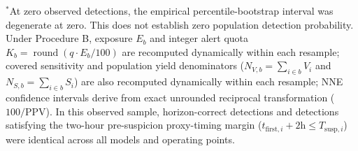 \documentclass[12pt,a4paper]{article}
\begin{document}
\begin{landscape}
\begin{table}[p]
\begin{singlespace}
\begin{tabular*}{\linewidth}{@{\extracolsep{\fill}}llccccccc}
\bottomrule
\end{tabular*}
\vspace{0.4em}
\raggedright
\fontsize{7.5pt}{9.5pt}\selectfont
$^*$At zero observed detections, the empirical percentile-bootstrap interval was degenerate at zero. This does not establish zero population detection probability. Under Procedure B, exposure $E_b$ and integer alert quota $K_b = \operatorname{round}(q \cdot E_b / 100)$ are recomputed dynamically within each resample; covered sensitivity and population yield denominators ($N_{V,b} = \sum_{i \in b} V_i$ and $N_{S,b} = \sum_{i \in b} S_i$) are also recomputed dynamically within each resample; NNE confidence intervals derive from exact unrounded reciprocal transformation ($100/\text{PPV}$). In this observed sample, horizon-correct detections and detections satisfying the two-hour pre-suspicion proxy-timing margin ($t_{\mathrm{first}, i} + 2\text{h} \le T_{\mathrm{susp}, i}$) were identical across all models and operating points.
\end{singlespace}
\end{table}
\end{landscape}
\end{document}

